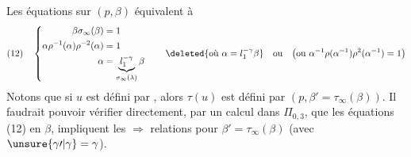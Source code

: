 Les équations sur $(p,\beta)$ équivalent à 
\[
(12)\quad\left\{\begin{aligned}
\beta\sigma_\infty(\beta)&=1\\
\alpha\rho^{-1}(\alpha)\rho^{-2}(\alpha)&=1\\
\alpha&=\underbrace{l_1^{-\gamma}}_{\sigma_\infty(\lambda)}\beta
\end{aligned}\right.
\qquad\deleted{\text{où }\alpha=l_1^{-\gamma}\beta}\quad\text{ou}\quad
\bigl(\text{ou }\alpha^{-1}\rho(\alpha^{-1})\rho^2(\alpha^{-1})=1\bigr)
\]
Notons que si $u$ est défini par \deleted{$\beta$}\inserted{$\beta)$}, alors
$\tau(u)$  est défini par $(p,\beta'=\tau_\infty(\beta))$. Il faudrait pouvoir vérifier directement, par un calcul dans $\Pi_{0,3}$, que les équations (12) en $\beta$, impliquent les $\Rightarrow$ relations pour $\beta'=\tau_\infty(\beta)$ (avec $\unsure{\gamma\prime|\gamma}=\gamma$).


